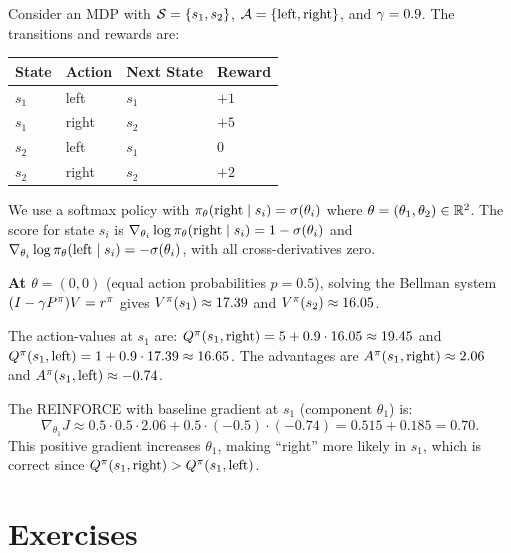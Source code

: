 \documentclass[11pt,a4paper]{article}
\begin{document}
\begin{example}
\label{ex:two-state}
Consider an MDP with $\mathcal{S} = \{s_1, s_2\}$,
$\mathcal{A} = \{\text{left}, \text{right}\}$, and $\gamma = 0.9$.
The transitions and rewards are:
\begin{center}
\begin{tabular}{llll}
\toprule
State & Action & Next State & Reward \\
\midrule
$s_1$ & left & $s_1$ & $+1$ \\
$s_1$ & right & $s_2$ & $+5$ \\
$s_2$ & left & $s_1$ & $0$ \\
$s_2$ & right & $s_2$ & $+2$ \\
\bottomrule
\end{tabular}
\end{center}

We use a softmax policy with $\pi_\theta(\text{right} \mid s_i) =
\sigma(\theta_i)$ where $\theta = (\theta_1, \theta_2) \in \mathbb{R}^2$.
The score for state $s_i$ is
$\nabla_{\theta_i} \log \pi_\theta(\text{right} \mid s_i) =
1 - \sigma(\theta_i)$ and
$\nabla_{\theta_i} \log \pi_\theta(\text{left} \mid s_i) =
-\sigma(\theta_i)$, with all cross-derivatives zero.

\textbf{At $\theta = (0, 0)$} (equal action probabilities $p = 0.5$),
solving the Bellman system
$(I - \gamma P^\pi) V = r^\pi$ gives $V^{\pi}(s_1) \approx 17.39$
and $V^{\pi}(s_2) \approx 16.05$.

The action-values at $s_1$ are:
$Q^{\pi}(s_1, \text{right}) = 5 + 0.9 \cdot 16.05 \approx 19.45$ and
$Q^{\pi}(s_1, \text{left}) = 1 + 0.9 \cdot 17.39 \approx 16.65$.
The advantages are $A^\pi(s_1, \text{right}) \approx 2.06$ and
$A^\pi(s_1, \text{left}) \approx -0.74$.

The REINFORCE with baseline gradient at $s_1$ (component $\theta_1$) is:
\[
  \nabla_{\theta_1} J \approx 0.5 \cdot 0.5 \cdot 2.06
  + 0.5 \cdot (-0.5) \cdot (-0.74) = 0.515 + 0.185 = 0.70.
\]
This positive gradient increases $\theta_1$, making ``right'' more
likely in $s_1$, which is correct since $Q^{\pi}(s_1, \text{right}) >
Q^{\pi}(s_1, \text{left})$.
\end{example}

\section{Exercises}
\end{document}
